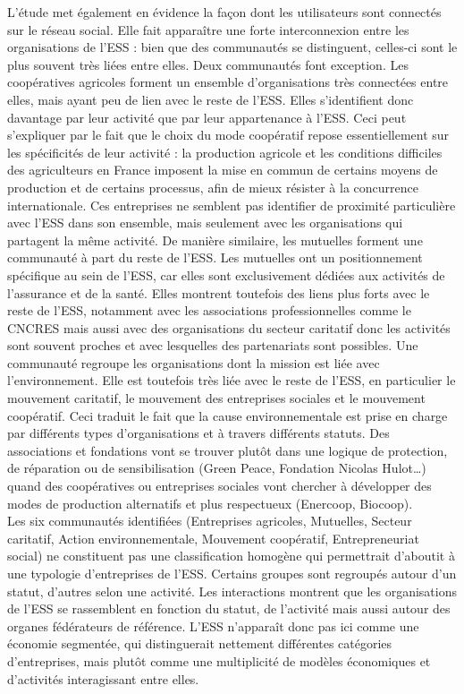             L’étude met également en évidence la façon dont les utilisateurs sont connectés sur le réseau social. Elle fait apparaître une forte interconnexion entre les organisations de l’ESS : bien que des communautés se distinguent, celles-ci sont le plus souvent très liées entre elles. Deux communautés font exception. Les coopératives agricoles forment un ensemble d’organisations très connectées entre elles, mais ayant peu de lien avec le reste de l’ESS. Elles s’identifient donc davantage par leur activité que par leur appartenance à l’ESS. Ceci peut s’expliquer par le fait que le choix du mode coopératif repose essentiellement sur les spécificités de leur activité : la production agricole et les conditions difficiles des agriculteurs en France imposent la mise en commun de certains moyens de production et de certains processus, afin de mieux résister à la concurrence internationale. Ces entreprises ne semblent pas identifier de proximité particulière avec l’ESS dans son ensemble, mais seulement avec les organisations qui partagent la même activité.
            De manière similaire, les mutuelles forment une communauté à part du reste de l’ESS. Les mutuelles ont un positionnement spécifique au sein de l’ESS, car elles sont exclusivement dédiées aux activités de l’assurance et de la santé. Elles montrent toutefois des liens plus forts avec le reste de l’ESS, notamment avec les associations professionnelles comme le CNCRES mais aussi avec des organisations du secteur caritatif donc les activités sont souvent proches et avec lesquelles des partenariats sont possibles.
            Une communauté regroupe les organisations dont la mission est liée avec l’environnement. Elle est toutefois très liée avec le reste de l’ESS, en particulier le mouvement caritatif, le mouvement des entreprises sociales et le mouvement coopératif. Ceci traduit le fait que la cause environnementale est prise en charge par différents types d’organisations et à travers différents statuts. Des associations et fondations vont se trouver plutôt dans une logique de protection, de réparation ou de sensibilisation (Green Peace, Fondation Nicolas Hulot…) quand des coopératives ou entreprises sociales vont chercher à développer des modes de production alternatifs et plus respectueux (Enercoop, Biocoop).\\

            Les six communautés identifiées (Entreprises agricoles, Mutuelles, Secteur caritatif, Action environnementale, Mouvement coopératif, Entrepreneuriat social) ne constituent pas une classification homogène qui permettrait d’aboutit à une typologie d’entreprises de l’ESS. Certains groupes sont regroupés autour d’un statut, d’autres selon une activité. Les interactions montrent que les organisations de l’ESS se rassemblent en fonction du statut, de l’activité mais aussi autour des organes fédérateurs de référence. L’ESS n’apparaît donc pas ici comme une économie segmentée, qui distinguerait nettement différentes catégories d’entreprises, mais plutôt comme une multiplicité de modèles économiques et d’activités interagissant entre elles.

